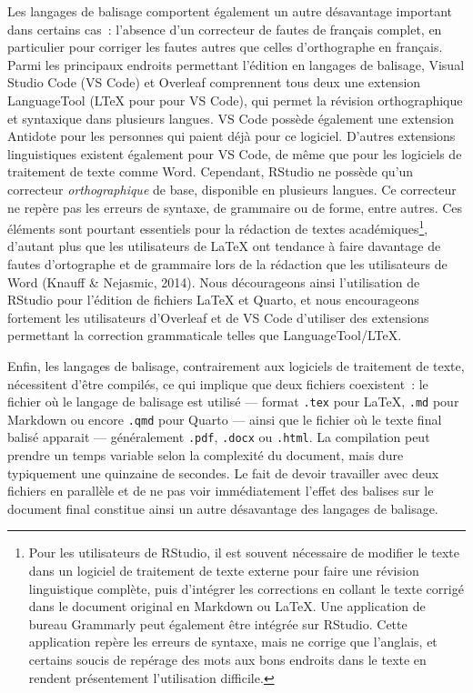 \documentclass[
  letterpaper,
  DIV=11,
  numbers=noendperiod]{scrreprt}
\begin{document}
Les langages de balisage comportent également un autre désavantage
important dans certains cas~: l'absence d'un correcteur de fautes de
français complet, en particulier pour corriger les fautes autres que
celles d'orthographe en français. Parmi les principaux endroits
permettant l'édition en langages de balisage, Visual Studio Code (VS
Code) et Overleaf comprennent tous deux une extension LanguageTool (LTeX
pour pour VS Code), qui permet la révision orthographique et syntaxique
dans plusieurs langues. VS Code possède également une extension Antidote
pour les personnes qui paient déjà pour ce logiciel. D'autres extensions
linguistiques existent également pour VS Code, de même que pour les
logiciels de traitement de texte comme Word. Cependant, RStudio ne
possède qu'un correcteur \emph{orthographique} de base, disponible en
plusieurs langues. Ce correcteur ne repère pas les erreurs de syntaxe,
de grammaire ou de forme, entre autres. Ces éléments sont pourtant
essentiels pour la rédaction de textes académiques\footnote{Pour les
  utilisateurs de RStudio, il est souvent nécessaire de modifier le
  texte dans un logiciel de traitement de texte externe pour faire une
  révision linguistique complète, puis d'intégrer les corrections en
  collant le texte corrigé dans le document original en Markdown ou
  LaTeX. Une application de bureau Grammarly peut également être
  intégrée sur RStudio. Cette application repère les erreurs de syntaxe,
  mais ne corrige que l'anglais, et certains soucis de repérage des mots
  aux bons endroits dans le texte en rendent présentement l'utilisation
  difficile.}, d'autant plus que les utilisateurs de LaTeX ont tendance
à faire davantage de fautes d'ortographe et de grammaire lors de la
rédaction que les utilisateurs de Word (Knauff \& Nejasmic, 2014). Nous
décourageons ainsi l'utilisation de RStudio pour l'édition de fichiers
LaTeX et Quarto, et nous encourageons fortement les utilisateurs
d'Overleaf et de VS Code d'utiliser des extensions permettant la
correction grammaticale telles que LanguageTool/LTeX.

Enfin, les langages de balisage, contrairement aux logiciels de
traitement de texte, nécessitent d'être compilés, ce qui implique que
deux fichiers coexistent~: le fichier où le langage de balisage est
utilisé --- format \texttt{.tex} pour LaTeX, \texttt{.md} pour Markdown
ou encore \texttt{.qmd} pour Quarto --- ainsi que le fichier où le texte
final balisé apparait --- généralement \texttt{.pdf}, \texttt{.docx} ou
\texttt{.html}. La compilation peut prendre un temps variable selon la
complexité du document, mais dure typiquement une quinzaine de secondes.
Le fait de devoir travailler avec deux fichiers en parallèle et de ne
pas voir immédiatement l'effet des balises sur le document final
constitue ainsi un autre désavantage des langages de balisage.
\end{document}
